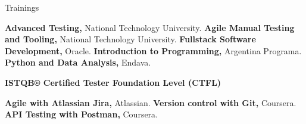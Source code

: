 \begin{rubric}{Trainings}


%
	\textbf{Advanced Testing,} National Technology University.
%
%
	\textbf{Agile Manual Testing and Tooling,} National Technology University.
%
%
	\textbf{Fullstack Software Development,} Oracle.
%
%
	\textbf{Introduction to Programming,} Argentina Programa.
%
%
	\textbf{Python and Data Analysis,} Endava.
%

%
\entry*[2024]%
	\textbf{ISTQB® Certified Tester Foundation Level (CTFL)}


\entry*[Jan 2024]%
	\textbf{Agile with Atlassian Jira,} Atlassian.
%
\entry*[Feb 2024]%
	\textbf{Version control with Git,} Coursera.
%
\entry*[Mar 2024]%
	\textbf{API Testing with Postman,} Coursera.
%
\end{rubric}